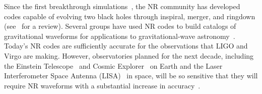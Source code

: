 \begin{bibunit}[unsrtnat]
Since the first breakthrough simulations~\cite{Pretorius:2005gq,
  Campanelli:2005dd, Baker:2005vv}, the NR community has developed codes capable
  of evolving two black holes through inspiral, merger, and ringdown
  (see~ for a review). Several groups have
  used NR codes to build catalogs of gravitational waveforms for applications to
  gravitational-wave astronomy~. 
  Today's NR codes are sufficiently accurate for the
  observations that LIGO and Virgo are making. However, observatories planned
  for the next decade, including the Einstein
  Telescope~\cite{2010CQGra..27s4002P} and Cosmic Explorer~\cite{Evans:2021gyd}
  on Earth and the Laser Interferometer Space Antenna
  (LISA)~\cite{2017arXiv170200786A} in space, will be so sensitive that they
  will require NR waveforms with a substantial increase in
  accuracy~\cite{Purrer:2019jcp, Ferguson:2020xnm, Jan:2023raq}.


\end{bibunit}
